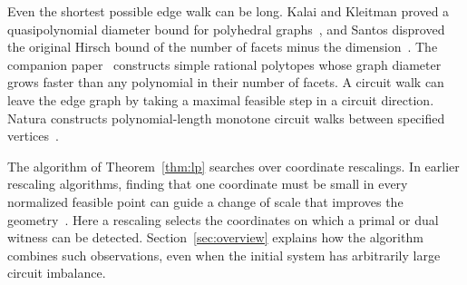 Even the shortest possible edge walk can be long. Kalai and
Kleitman proved a quasipolynomial diameter bound for polyhedral
graphs~\cite{KK}, and Santos disproved the original Hirsch bound of
the number of facets minus the dimension~\cite{Santos}. The companion
paper~\cite{OAIHirsch} constructs simple rational polytopes whose
graph diameter grows faster than any polynomial in their number of
facets. A circuit walk can leave the edge graph by taking a maximal
feasible step in a circuit direction. Natura constructs polynomial-length
monotone circuit walks between specified vertices~\cite{Natura}.

The algorithm of Theorem~\ref{thm:lp} searches over coordinate
rescalings. In earlier rescaling algorithms, finding that one coordinate
must be small in every normalized feasible point can guide a change
of scale that improves the geometry~\cite{Betke,DV,Chu,DVZ,PS}. Here a
rescaling selects the coordinates on which a primal or dual witness
can be detected. Section~\ref{sec:overview} explains how the algorithm
combines such observations, even when the initial system has arbitrarily
large circuit imbalance.
